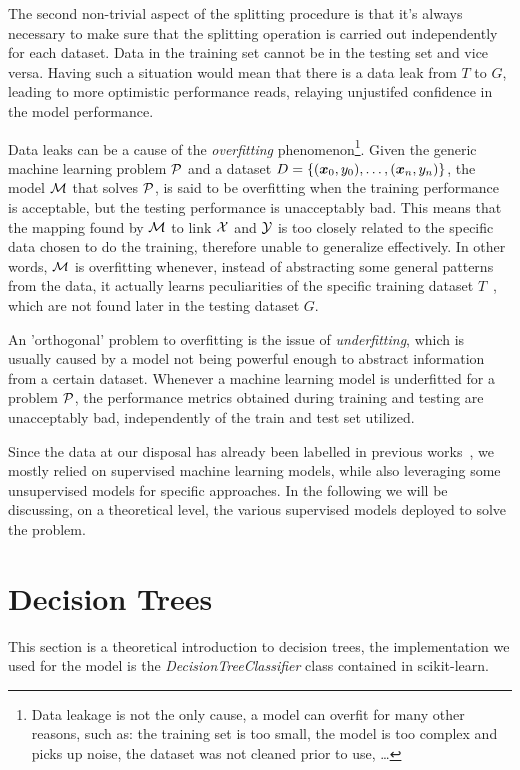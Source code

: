 The second non-trivial aspect of the splitting procedure is that it's always necessary to make sure
that the splitting operation is carried out independently for each dataset. Data in the training set
cannot be in the testing set and vice versa. Having such a situation would mean that there is a data
leak from $T$ to $G$, leading to more optimistic performance reads, relaying unjustifed confidence in the model performance.

\smallskip

Data leaks can be a cause of the \emph{overfitting} phenomenon\footnote{
	Data leakage is not the only cause, a model can overfit for many other reasons, such as: the
	training set is too small, the model is too complex and picks up noise, the dataset was not
	cleaned prior to use, \ldots
	}.
Given the generic machine learning problem $\mathcal{P}$ and a dataset $D = \{(\boldsymbol{x}_0, y_0), \allowbreak\ldots\allowbreak, (\boldsymbol{x}_n, y_n)\}$, the model $\mathcal{M}$ that solves $\mathcal{P}$, is said to be overfitting when the training performance is acceptable, but the testing performance is unacceptably bad. This means that the mapping found by $\mathcal{M}$ to link $\mathcal{X}$ and $\mathcal{Y}$ is too closely related to the specific data chosen to do the training, therefore unable to generalize effectively. In other words, $\mathcal{M}$ is overfitting whenever, instead of abstracting some general patterns from the data, it actually learns peculiarities of the specific training dataset $T$~\cite{ZhouZhi-Hua2021ML}, which are not found later in the testing dataset $G$.

\smallskip

An 'orthogonal' problem to overfitting is the issue of \emph{underfitting}, which is usually caused
by a model not being powerful enough to abstract information from a certain dataset. Whenever a
machine learning model is underfitted for a problem $\mathcal{P}$, the performance metrics obtained
during training and testing are unacceptably bad, independently of the train and test set
utilized.

\medskip

Since the data at our disposal has already been labelled in previous works~\cite{mariotto2022,
mariotto2022-generic}, we mostly relied on supervised machine learning models, while also leveraging
some unsupervised models for specific approaches. In the following we will be discussing, on a theoretical level, the various supervised models deployed to solve the problem.

\section{Decision Trees}
\label{sec:dt}
This section is a theoretical introduction to decision trees, the implementation we used for the
model is the \emph{DecisionTreeClassifier} class contained in scikit-learn.


